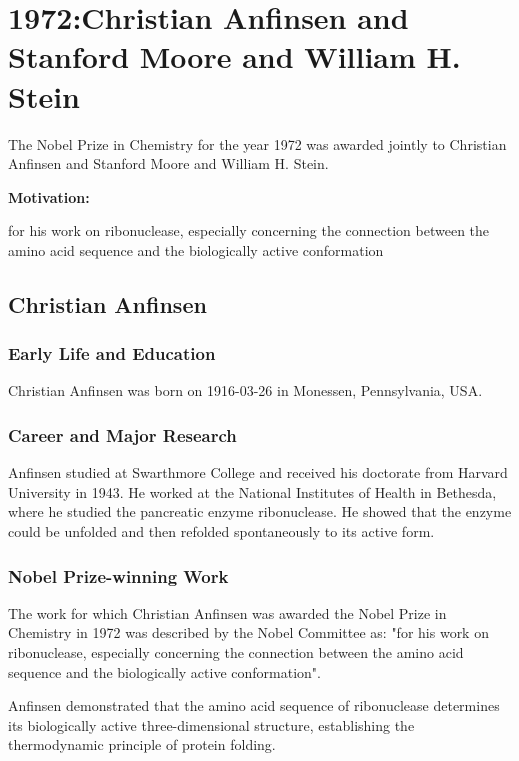 \chapter{1972:Christian Anfinsen and Stanford Moore and William H. Stein}

\label{chap:chemistry1972}

The Nobel Prize in Chemistry for the year 1972 was awarded jointly to Christian Anfinsen and Stanford Moore and William H. Stein.

\textbf{Motivation:}

for his work on ribonuclease, especially concerning the connection between the amino acid sequence and the biologically active conformation

\section{Christian Anfinsen}

\subsection*{Early Life and Education}

Christian Anfinsen was born on 1916-03-26 in Monessen, Pennsylvania, USA.

\subsection*{Career and Major Research}

Anfinsen studied at Swarthmore College and received his doctorate from Harvard University in 1943. He worked at the National Institutes of Health in Bethesda, where he studied the pancreatic enzyme ribonuclease. He showed that the enzyme could be unfolded and then refolded spontaneously to its active form.

\subsection*{Nobel Prize-winning Work}

The work for which Christian Anfinsen was awarded the Nobel Prize in Chemistry in 1972 was described by the Nobel Committee as: "for his work on ribonuclease, especially concerning the connection between the amino acid sequence and the biologically active conformation".

Anfinsen demonstrated that the amino acid sequence of ribonuclease determines its biologically active three-dimensional structure, establishing the thermodynamic principle of protein folding.

